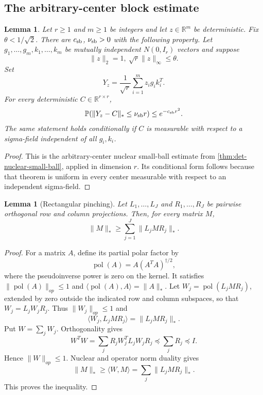 \documentclass[11pt]{article}
\numberwithin{equation}{section}
\newtheorem{lemma}[theorem]{Lemma}
\theoremstyle{definition}
\theoremstyle{remark}
\newcommand{\Pp}{\mathbb P}
\newcommand{\1}{\boldsymbol 1}
\begin{document}
\begin{aiblock}
\subsection{The arbitrary-center block
  estimate}\label{the-arbitrary-center-block-estimate}

\begin{lemma}\label{record-lemma-2-1}
  Let $r\ge1$ and $m\ge1$ be integers and let
  $z\in{\mathbb R}^{m}$ be deterministic. Fix
  $\theta<1/\sqrt2$. There are $c_{\rm sb}$,
  $\nu_{\rm sb}>0$ with the following property. Let
  $g_1,\ldots,g_m,k_1,\ldots,k_m$ be mutually
  independent $N(0,I_r)$ vectors and suppose
  \[
    \|z\|_2=1,\ \sqrt r\|z\|_\infty\le\theta.
  \]
  Set
  \[
    Y_z=\frac1{\sqrt r}\sum_{i=1}^{m} z_i g_i k_i^T.
  \]
  For every deterministic $C\in{\mathbb R}^{r\times r}$,
  \[
    \Pp(\|Y_z-C\|_*\le\nu_{\rm sb}r)\le
    e^{-c_{\rm sb}r^2}.
  \]
  The same statement holds conditionally if $C$ is
  measurable with respect to a sigma-field independent
  of all $g_i,k_i$.
\end{lemma}

\begin{proof}
  This is the arbitrary-center nuclear small-ball
  estimate from \cref{thm:det-nuclear-small-ball},
  applied in dimension $r$. Its conditional form follows
  because that theorem is uniform in every center
  measurable with respect to an independent sigma-field.
\end{proof}

\begin{lemma}[Rectangular
  pinching]\label{record-lemma-2-2}
  Let $L_1,\ldots,L_J$ and $R_1,\ldots,R_J$ be pairwise
  orthogonal row and column projections. Then, for every
  matrix $M$,
  \[
    \|M\|_*\ge\sum_{j=1}^J\|L_jMR_j\|_*.
  \]
\end{lemma}

\begin{proof}
  For a matrix $A$, define its partial polar factor by
  \[
    \operatorname{pol}(A)=A(A^TA)^{\dagger/2},
  \]
  where the pseudoinverse power is zero on the kernel. It
  satisfies $\|\operatorname{pol}(A)\|_{op}\le1$ and
  $\langle\operatorname{pol}(A),A\rangle=\|A\|_*$. Let
  $W_j=\operatorname{pol}(L_jMR_j)$, extended by zero
  outside the indicated row and column subspaces, so that
  $W_j=L_jW_jR_j$. Thus $\|W_j\|_{op}\le1$ and
  \[
    \langle W_j,L_jMR_j\rangle=\|L_jMR_j\|_*.
  \]
  Put $W=\sum_jW_j$. Orthogonality gives
  \[
    W^TW=\sum_jR_jW_j^TL_jW_jR_j\preceq\sum_jR_j\preceq
    I.
  \]
  Hence $\|W\|_{op}\le1$. Nuclear and operator norm
  duality gives
  \[
    \|M\|_*\ge\langle W,M\rangle=\sum_j\|L_jMR_j\|_*.
  \]
  This proves the inequality.
\end{proof}



\end{aiblock}
\end{document}
